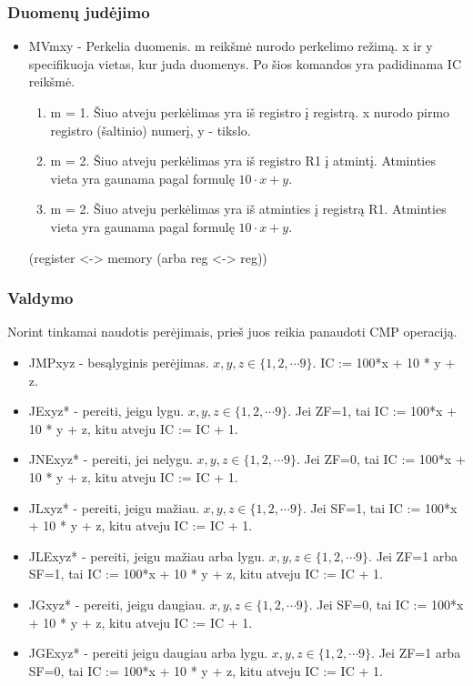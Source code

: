 \documentclass{VUMIFInfKursinis}
\begin{document}
\subsubsection{Duomenų judėjimo}
\begin{itemize}
	\item MVmxy - Perkelia duomenis. m reikšmė nurodo perkelimo režimą. x ir y specifikuoja vietas, kur juda duomenys. Po šios komandos yra padidinama IC reikšmė.
	\begin{enumerate}
		\item m = 1. Šiuo atveju perkėlimas yra iš registro į registrą. x nurodo pirmo registro (šaltinio) numerį, y - tikslo.
		\item m = 2. Šiuo atveju perkėlimas yra iš registro R1 į atmintį. Atminties vieta yra gaunama pagal formulę $10 \cdot x + y$.
		\item m = 2. Šiuo atveju perkėlimas yra iš atminties į registrą R1. Atminties vieta yra gaunama pagal formulę $10 \cdot x + y$.
	\end{enumerate}(register <-> memory (arba reg <-> reg))
\end{itemize}

\subsubsection{Valdymo}
Norint tinkamai naudotis perėjimais, prieš juos reikia panaudoti CMP operaciją. 
\begin{itemize}
	\item JMPxyz - besąlyginis perėjimas. $x, y, z \in \{1, 2, \cdots 9 \}$. IC := 100*x + 10 * y + z.
	\item JExyz* - pereiti, jeigu lygu. $x, y, z \in \{1, 2, \cdots 9 \}$. Jei ZF=1, tai IC := 100*x + 10 * y + z, kitu atveju IC := IC + 1.
	\item JNExyz* - pereiti, jei nelygu. $x, y, z \in \{1, 2, \cdots 9 \}$. Jei ZF=0, tai IC := 100*x + 10 * y + z, kitu atveju IC := IC + 1.
	\item JLxyz* - pereiti, jeigu mažiau. $x, y, z \in \{1, 2, \cdots 9 \}$. Jei SF=1, tai IC := 100*x + 10 * y + z, kitu atveju IC := IC + 1.
	\item JLExyz* - pereiti, jeigu mažiau arba lygu. $x, y, z \in \{1, 2, \cdots 9 \}$. Jei ZF=1 arba SF=1, tai IC := 100*x + 10 * y + z, kitu atveju IC := IC + 1.
	\item JGxyz* - pereiti, jeigu daugiau. $x, y, z \in \{1, 2, \cdots 9 \}$. Jei SF=0, tai IC := 100*x + 10 * y + z, kitu atveju IC := IC + 1.
	\item JGExyz* - pereiti jeigu daugiau arba lygu. $x, y, z \in \{1, 2, \cdots 9 \}$. Jei ZF=1 arba SF=0, tai IC := 100*x + 10 * y + z, kitu atveju IC := IC + 1.
\end{itemize}
\end{document}
